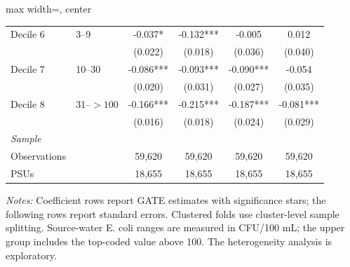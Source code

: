\begin{landscape}
\begin{table}[p]
\begin{adjustbox}{max width=\linewidth, center}
\begin{tabular}{llcccc}
Decile 6 & 3--9 & -0.037* & -0.132*** & -0.005 & 0.012 \\
 &  & (0.022) & (0.018) & (0.036) & (0.040) \\
Decile 7 & 10--30 & -0.086*** & -0.093*** & -0.090*** & -0.054 \\
 &  & (0.020) & (0.031) & (0.027) & (0.035) \\
Decile 8 & 31--$>100$ & -0.166*** & -0.215*** & -0.187*** & -0.081*** \\
 &  & (0.016) & (0.018) & (0.024) & (0.029) \\
\multicolumn{6}{l}{\textit{Sample}} \\
\quad Observations &  & 59,620 & 59,620 & 59,620 & 59,620 \\
\quad PSUs &  & 18,655 & 18,655 & 18,655 & 18,655 \\
\bottomrule
\end{tabular}
\end{adjustbox}
\par\vspace{3pt}
\begin{minipage}{\linewidth}\footnotesize \textit{Notes:} Coefficient rows report GATE estimates with significance stars; the following rows report standard errors. Clustered folds use cluster-level sample splitting. Source-water E. coli ranges are measured in CFU/100 mL; the upper group includes the top-coded value above 100. The heterogeneity analysis is exploratory.\end{minipage}
\end{table}
\end{landscape}